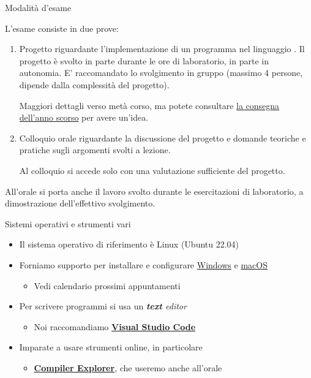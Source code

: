 \begin{frame}{Modalità d'esame}

  L'esame consiste in due prove:

  \begin{enumerate}

  \item Progetto riguardante l'implementazione di un programma nel linguaggio
    \Cpp{}. Il progetto è svolto in parte durante le ore di laboratorio, in
    parte in autonomia. E' raccomandato lo svolgimento in gruppo (massimo 4
    persone, dipende dalla complessità del progetto).

    Maggiori dettagli verso metà corso, ma potete consultare
    \href{https://github.com/Programmazione-per-la-Fisica/progetto2022}{la
      consegna dell'anno scorso} per avere un'idea.

  \item Colloquio orale riguardante la discussione del progetto e domande
    teoriche e pratiche sugli argomenti svolti a lezione.

    Al colloquio si accede solo con una valutazione sufficiente del progetto.

  \end{enumerate}

  All'orale si porta anche il lavoro svolto durante le esercitazioni di
  laboratorio, a dimostrazione dell'effettivo svolgimento.

\end{frame}

\begin{frame}{Sistemi operativi e strumenti vari}
  \begin{itemize}[<+->]
  \item Il sistema operativo di riferimento è Linux (Ubuntu 22.04)
  \item Forniamo supporto per installare e configurare
      \href{https://github.com/Programmazione-per-la-Fisica/howto/blob/main/other-OSes/WSLGuide.md}{Windows} e
      \href{https://github.com/Programmazione-per-la-Fisica/howto/blob/main/other-OSes/macOSGuide.md}{macOS}
      \begin{itemize}
      \item Vedi calendario prossimi appuntamenti
      \end{itemize}
  \item Per scrivere programmi si usa un \textit{\textbf{text} editor}
    \begin{itemize}[<.->]
    \item Noi raccomandiamo \href{https://code.visualstudio.com/}{\textbf{Visual
          Studio Code}}
    \end{itemize}
  \item Imparate a usare strumenti online, in particolare
    \begin{itemize}[<.->]
    \item \href{https://godbolt.org/}{\textbf{Compiler Explorer}}, che useremo
      anche all'orale
    \end{itemize}
  \end{itemize}

\end{frame}

